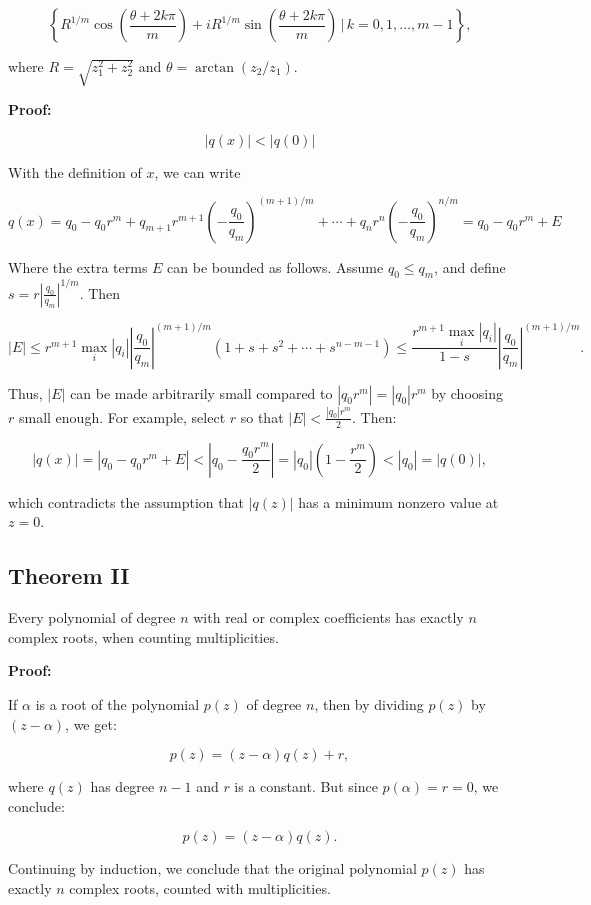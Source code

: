 \[
	\left\{ R^{1/m} \cos\left(\frac{\theta + 2k\pi}{m}\right) + i R^{1/m} \sin\left(\frac{\theta + 
	2k\pi}{m}\right) \,\bigg|\, k = 0, 1, \ldots, m-1 \right\},
\]

where \(R = \sqrt{z_1^2 + z_2^2}\) and \(\theta = \arctan(z_2 / z_1)\).

\textbf{Proof:} 

\[|q(x)| < |q(0)|\]

With the definition of \(x\), we can write

\[
	q(x) = q_0 - q_0 r^m + q_{m+1} r^{m+1} {\left(-\frac{q_0}{q_m}\right)}^{(m+1)/m} + \cdots + q_n r^n 
	{\left(-\frac{q_0}{q_m}\right)}^{n/m} = q_0 - q_0 r^m + E
\]

Where the extra terms \(E\) can be bounded as follows. Assume \(q_0 \leq q_m\), and define 
\(s = r \left|\frac{q_0}{q_m}\right|^{1/m}\). Then

\[
	|E| \leq r^{m+1} \max_i |q_i| \left|\frac{q_0}{q_m}\right|^{(m+1)/m} (1 + s + s^2 + 
	\cdots + s^{n - m - 1}) \leq \frac{r^{m+1} \max_i |q_i|}{1 - s} \left|\frac{q_0}{q_m}\right|^{(m+1)/m}.
\]

Thus, \(|E|\) can be made arbitrarily small compared to \(|q_0 r^m| = |q_0| r^m\) by choosing \(r\) 
small enough. For example, select \(r\) so that \(|E| < \frac{|q_0| r^m}{2}\). Then:

\[
	|q(x)| = |q_0 - q_0 r^m + E| < |q_0 - \frac{q_0 r^m}{2}| = |q_0| \left(1 - \frac{r^m}{2}\right) < 
	|q_0| = |q(0)|,
\]

which contradicts the assumption that \(|q(z)|\) has a minimum nonzero value at \(z = 0\).
\QED

\subsection{Theorem II}

Every polynomial of degree \(n\) with real or complex coefficients has exactly \(n\) complex roots, 
when counting multiplicities.

\textbf{Proof:}

If \(\alpha\) is a root of the polynomial \(p(z)\) of degree \(n\), then by dividing 
\(p(z)\) by \((z - \alpha)\), we get:

\[
	p(z) = (z - \alpha) q(z) + r,
\]

where \(q(z)\) has degree \(n - 1\) and \(r\) is a constant. But since \(p(\alpha) = r = 0\), we conclude:

\[
	p(z) = (z - \alpha) q(z).
\]

Continuing by induction, we conclude that the original polynomial \(p(z)\) has exactly \(n\) 
complex roots, counted with multiplicities.

\QED
